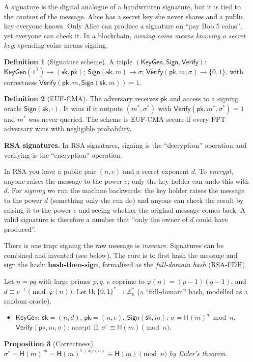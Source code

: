 \documentclass[11pt,a4paper]{article}
\newenvironment{plainenglish}{\par\smallskip}{\par\smallskip}
\newenvironment{formal}{\par\smallskip}{\par\smallskip}
\theoremstyle{definition}
\newtheorem{definition}{Definition}[section]
\theoremstyle{plain}
\newtheorem{proposition}[definition]{Proposition}
\theoremstyle{remark}
\newcommand{\Hash}{\mathsf{H}}
\newcommand{\Z}{\mathbb{Z}}
\newcommand{\sk}{\mathsf{sk}}
\newcommand{\pk}{\mathsf{pk}}
\newcommand{\KeyGen}{\mathsf{KeyGen}}
\newcommand{\Sign}{\mathsf{Sign}}
\newcommand{\Verify}{\mathsf{Verify}}
\begin{document}
\begin{plainenglish}
A signature is the digital analogue of a handwritten signature, but it is tied to the \emph{content}
of the message. Alice has a secret key she never shares and a public key everyone knows. Only Alice can produce a signature
on ``pay Bob 5 coins'', yet everyone can check it. In a blockchain, \emph{owning coins means knowing a secret key}; spending coins means signing.
\end{plainenglish}

\begin{formal}
\begin{definition}[Signature scheme]
A triple $(\KeyGen,\Sign,\Verify)$: $\KeyGen(1^\lambda)\to(\sk,\pk)$; $\Sign(\sk,m)\to\sigma$; $\Verify(\pk,m,\sigma)\to\{0,1\}$,
with correctness $\Verify(\pk,m,\Sign(\sk,m))=1$.
\end{definition}

\begin{definition}[EUF-CMA]
The adversary receives $\pk$ and access to a signing oracle $\Sign(\sk,\cdot)$. It wins if it outputs $(m^*,\sigma^*)$ with
$\Verify(\pk,m^*,\sigma^*)=1$ and $m^*$ was never queried. The scheme is EUF-CMA secure if every PPT adversary wins with negligible probability.
\end{definition}

\textbf{RSA signatures.} In RSA signatures, signing is the ``decryption'' operation and verifying is the ``encryption'' operation.

\begin{plainenglish}
In RSA you have a public pair $(n,e)$ and a secret exponent $d$. To \emph{encrypt}, anyone raises the message to the power $e$; only the key holder can undo this with $d$. For \emph{signing} we run the machine backwards: the key holder raises the message to the power $d$ (something only she can do) and anyone can check the result by raising it to the power $e$ and seeing whether the original message comes back. A valid signature is therefore a number that ``only the owner of $d$ could have produced''.

There is one trap: signing the raw message is \emph{insecure}. Signatures can be combined and invented (see below). The cure is to first hash the message and sign the hash: \textbf{hash-then-sign}, formalised as the \emph{full-domain hash} (RSA-FDH).
\end{plainenglish}

\begin{formal}
Let $n=pq$ with large primes $p,q$, $e$ coprime to $\varphi(n)=(p-1)(q-1)$, and $d\equiv e^{-1}\pmod{\varphi(n)}$. Let $\Hash:\{0,1\}^*\to\Z_n^*$ (a ``full-domain'' hash, modelled as a random oracle).
\begin{itemize}[nosep]
\item $\KeyGen$: $\sk=(n,d)$, $\pk=(n,e)$. \quad $\Sign(\sk,m)$: $\sigma=\Hash(m)^d\bmod n$. \quad $\Verify(\pk,m,\sigma)$: accept iff $\sigma^e\equiv\Hash(m)\pmod n$.
\end{itemize}
\begin{proposition}[Correctness]
$\sigma^e=\Hash(m)^{ed}=\Hash(m)^{1+k\varphi(n)}\equiv\Hash(m)\pmod n$ by Euler's theorem.
\end{proposition}


\end{formal}
\end{formal}
\end{document}
